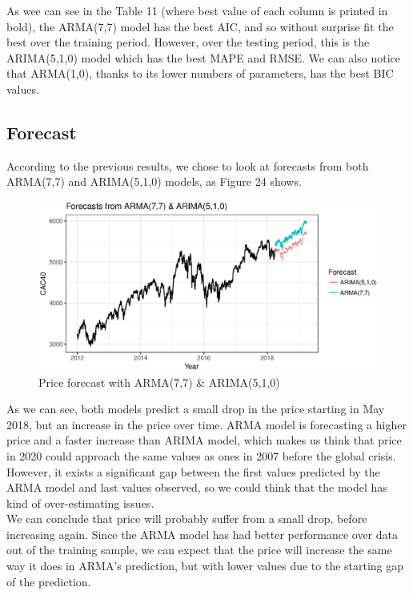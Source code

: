 As wee can see in the Table 11 (where best value of each column is printed in bold), the ARMA(7,7) model has the best AIC, and so without surprise fit the best over the training period. However, over the testing period, this is the ARIMA(5,1,0) model which has the best MAPE and RMSE. We can also notice that ARMA(1,0), thanks to its lower numbers of parameters, has the best BIC values.



\subsection{Forecast}

According to the previous results, we chose  to look at forecasts from both ARMA(7,7) and ARIMA(5,1,0) models, as Figure 24 shows. \\

\FloatBarrier
\begin{figure}[!htbp]
  \centering
  \includegraphics[width=\textwidth]{img/FC.eps}
  \caption{Price forecast with ARMA(7,7) \& ARIMA(5,1,0)}
\end{figure}
\FloatBarrier

As we can see, both models predict a small drop in the price starting in May 2018, but an increase in the price over time. ARMA model is forecasting a higher price and a faster increase than ARIMA model, which makes us think that price in 2020 could approach the same values as ones in 2007 before the global crisis. However, it exists a significant gap between the first values predicted by the ARMA model and last values observed, so we could think that the model has kind of over-estimating issues.  
\\
We can conclude that price will probably suffer from a small drop, before increasing again. Since the ARMA model has had better performance over data out of the training sample, we can expect that the price will increase the same way it does in ARMA's prediction, but with lower values due to the starting gap of the prediction.

